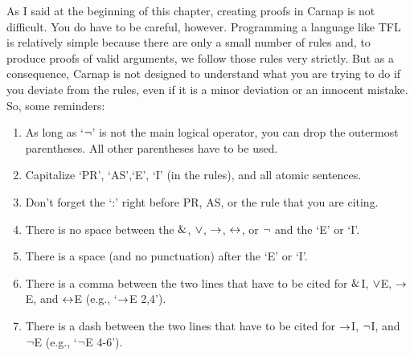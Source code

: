 


As I said at the beginning of this chapter, creating proofs in Carnap is not difficult. You do have to be careful, however. Programming a language like TFL is relatively simple because there are only a small number of rules and, to produce proofs of valid arguments, we follow those rules very strictly. But as a consequence, Carnap is not designed to understand what you are trying to do if you deviate from the rules, even if it is a minor deviation or an innocent mistake. So, some reminders:
\begin{enumerate}
\itemsep-.3mm
	\item As long as `${\neg}$' is not the main logical operator, you can drop the outermost parentheses. All other parentheses have to be used. 
	\item Capitalize `PR', `AS',`E', `I' (in the rules), and all atomic sentences.
	\item Don't forget the `:' right before PR, AS, or the rule that you are citing. 
	\item There is no space between the $\mathbin{\&}$, $\vee$, $\rightarrow$, $\leftrightarrow$, or ${\neg}$ and the `E' or `I'.  
	\item There is a space (and no punctuation) after the `E' or `I'. 
	\item There is a comma between the two lines that have to be cited for $\mathbin{\&}$I, $\vee$E, $\rightarrow$E, and $\leftrightarrow$E (e.g., `$\rightarrow$E 2,4').
	\item There is a dash between the two lines that have to be cited for $\rightarrow$I, ${\neg}$I, and ${\neg}$E (e.g., `${\neg}$E 4-6').
\end{enumerate}





